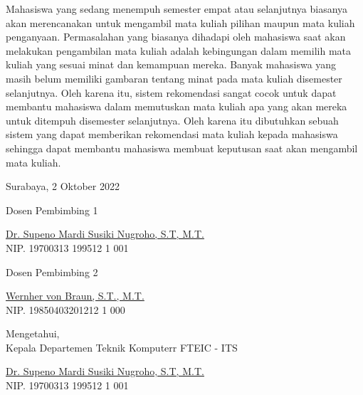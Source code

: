 Mahasiswa yang sedang menempuh semester empat atau selanjutnya biasanya akan merencanakan
untuk mengambil mata kuliah pilihan maupun mata kuliah penganyaan. Permasalahan yang biasanya dihadapi oleh mahasiswa
saat akan melakukan pengambilan mata kuliah adalah kebingungan dalam memilih mata kuliah
yang sesuai minat dan kemampuan mereka. Banyak mahasiswa yang masih belum memiliki gambaran
tentang minat pada mata kuliah disemester selanjutnya. Oleh karena itu, sistem rekomendasi
sangat cocok untuk dapat membantu mahasiswa dalam memutuskan mata kuliah apa yang akan mereka
untuk ditempuh disemester selanjutnya. Oleh karena itu dibutuhkan sebuah sistem yang dapat memberikan
rekomendasi mata kuliah kepada mahasiswa sehingga dapat membantu mahasiswa membuat keputusan saat akan
mengambil mata kuliah.
\vspace{1ex}

\begin{flushright}
  Surabaya, 2 Oktober 2022
\end{flushright}
\vspace{1ex}

\begin{center}

  \begin{multicols}{2}

    Dosen Pembimbing 1
    \vspace{12ex}

    \underline{Dr. Supeno Mardi Susiki Nugroho, S.T, M.T.} \\
    NIP. 19700313 199512 1 001

    \columnbreak

    Dosen Pembimbing 2
    \vspace{12ex}

    \underline{Wernher von Braun, S.T., M.T.} \\
    NIP. 19850403201212 1 000

  \end{multicols}


  \vspace{6ex}

  Mengetahui, \\
  Kepala Departemen Teknik Komputerr FTEIC - ITS
  \vspace{12ex}

  \underline{Dr. Supeno Mardi Susiki Nugroho, S.T, M.T.} \\
  NIP. 19700313 199512 1 001

\end{center}
